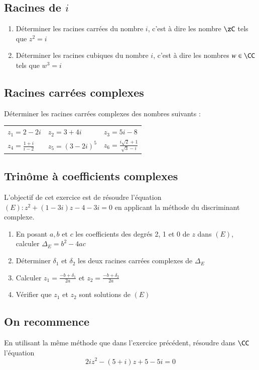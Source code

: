 \documentclass[oneside,12pt]{article}          %
\begin{document}
\subsection{Racines de $i$}
\begin{enumerate}
    \item Déterminer les \og racines carrées \fg du nombre $i$, c'est à dire les nombre $\zC$ tels que $z^2=i$
    \item Déterminer les \og racines cubiques \fg du nombre $i$, c'est à dire les nombres $w\in\CC$ tels que $w^3=i$
\end{enumerate}



\subsection{Racines carrées complexes}
Déterminer les racines carrées complexes des nombres suivants :

\begin{tabular}{p{} p{}p{}}
    $z_1=2-2i$ & $z_2=3+4i$ & $z_3 = 5i-8$\\
    $z_4=\frac{1+i}{i-2}$ & $z_5=(3-2i)^5$ & $z_6=\frac{i\sqrt{2}+1}{\sqrt{3}-i}$
\end{tabular}



\subsection{Trinôme à coefficients complexes}
L'objectif de cet exercice est de résoudre l'équation $(E):z^2+(1-3i)z-4-3i=0$ en applicant la méthode du discriminant complexe.
\begin{enumerate}
    \item En posant $a,b$ et $c$ les coefficients des degrés 2, 1 et 0 de $z$ dans $(E)$, calculer $\Delta_E=b^2-4ac$
    \item Déterminer $\delta_1$ et $\delta_2$ les deux racines carrées complexes de $\Delta_E$
    \item Calculer $z_1=\frac{-b+\delta_1}{2a}$ et $z_2=\frac{-b+\delta_2}{2a}$
    \item Vérifier que $z_1$ et $z_2$ sont solutions de $(E)$
\end{enumerate}



\subsection{On recommence}
En utilisant la même méthode que dans l'exercice précédent, résoudre dans $\CC$ l'équation \[2iz^2-(5+i)z+5-5i=0\]
\end{document}
